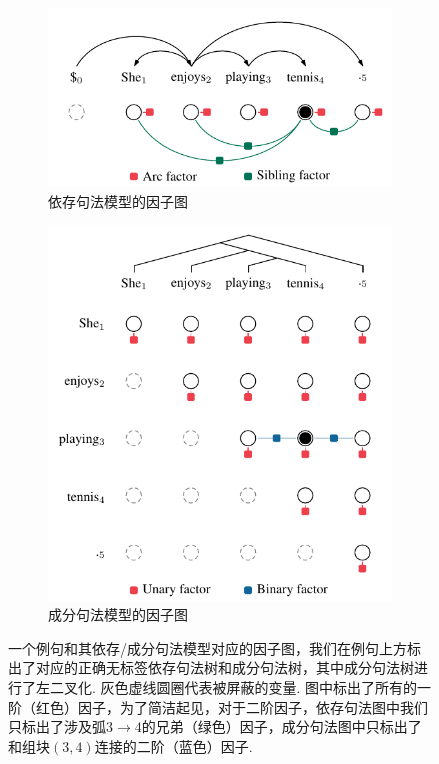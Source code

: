 \begin{figure}[tb!]
    \centering
    \begin{subfigure}[b]{0.8\textwidth}
        \centering
        \includegraphics[scale=1]{figures/dep-factors.pdf}
        \caption{依存句法模型的因子图}
        \label{fig:dep-factors}
    \end{subfigure}
    \begin{subfigure}[b]{0.8\textwidth}
        \centering
        \includegraphics[scale=1]{figures/con-factors.pdf}
        \caption{成分句法模型的因子图}
        \label{fig:con-factors}
    \end{subfigure}
    \caption{一个例句和其依存/成分句法模型对应的因子图，我们在例句上方标出了对应的正确无标签依存句法树和成分句法树，其中成分句法树进行了左二叉化.
        灰色虚线圆圈代表被屏蔽的变量.
        图中标出了所有的一阶（红色）因子，为了简洁起见，对于二阶因子，依存句法图中我们只标出了涉及弧$3\rightarrow 4$的兄弟（绿色）因子，成分句法图中只标出了和组块$(3, 4)$连接的二阶（蓝色）因子.}
    \label{fig:vi-factors}
\end{figure}

